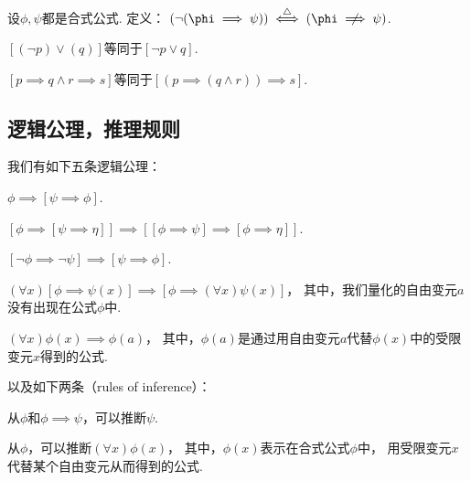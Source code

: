 \begin{definition}
设\(\phi,\psi\)都是合式公式.
定义：
\((\neg(\phi\implies\psi))
\defiff
(\phi\notimplies\psi)\).
\end{definition}

\begin{example}
\([(\neg p) \lor (q)]\)等同于\([\neg p \lor q]\).
\end{example}

\begin{example}
\([p \implies q \land r \implies s]\)等同于\([(p \implies (q \land r)) \implies s]\).
\end{example}

\subsection{逻辑公理，推理规则}
我们有如下五条逻辑公理：
\begin{axiom}
\(\phi \implies [\psi \implies \phi]\).
\end{axiom}
\begin{axiom}
\([\phi \implies [\psi \implies \eta]] \implies [[\phi \implies \psi] \implies [\phi \implies \eta]]\).
\end{axiom}
\begin{axiom}
\([\neg\phi \implies \neg\psi] \implies [\psi \implies \phi]\).
\end{axiom}
\begin{axiom}
\((\forall x)[\phi \implies \psi(x)] \implies [\phi \implies (\forall x) \psi(x)]\)，
其中，我们量化的自由变元\(a\)没有出现在公式\(\phi\)中.
\end{axiom}
\begin{axiom}
\((\forall x) \phi(x) \implies \phi(a)\)，
其中，\(\phi(a)\)是通过用自由变元\(a\)代替\(\phi(x)\)中的受限变元\(x\)得到的公式.
\end{axiom}
以及如下两条（rules of inference）：
\begin{axiom}
从\(\phi\)和\(\phi \implies \psi\)，可以推断\(\psi\).
\end{axiom}
\begin{axiom}
从\(\phi\)，可以推断\((\forall x) \phi(x)\)，
其中，\(\phi(x)\)表示在合式公式\(\phi\)中，
用受限变元\(x\)代替某个自由变元从而得到的公式.
\end{axiom}
